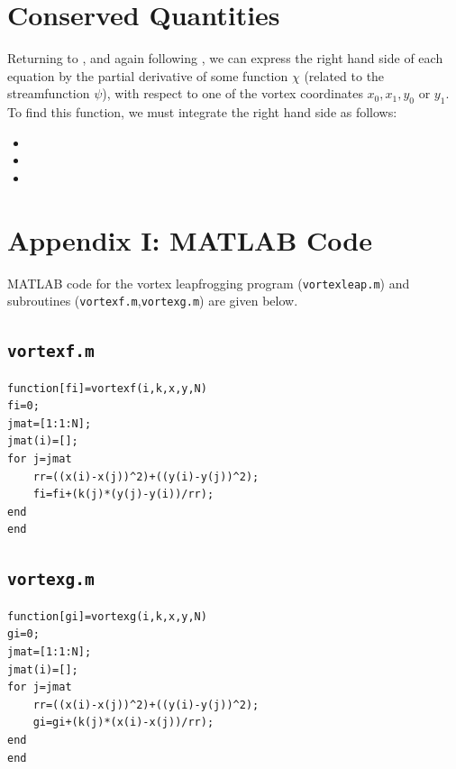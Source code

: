 \documentclass[10pt, a4paper]{article}
\numberwithin{equation}{section}
\begin{document}
\section{Conserved Quantities}
Returning to , and again following \citeauthor{love94}, we can express the right hand side of each equation by the partial derivative of some function $\chi$ (related to the streamfunction $\psi$), with respect to one of the vortex coordinates $x_0,x_1,y_0$ or $y_1$.
To find this function, we must integrate the right hand side as follows:
\begin{itemize}
\item 
\item 
\item 

\end{itemize}
\clearpage
\section*{Appendix I: MATLAB Code}\label{sec:ap1}
MATLAB code for the vortex leapfrogging program (\texttt{vortexleap.m}\normalfont) and subroutines (\texttt{vortexf.m}\normalfont,\texttt{vortexg.m}) are given below.
\subsection*{\texttt{vortexf.m}}
\label{vortexf}
\begin{verbatim}
function[fi]=vortexf(i,k,x,y,N)
fi=0;
jmat=[1:1:N];
jmat(i)=[];
for j=jmat
    rr=((x(i)-x(j))^2)+((y(i)-y(j))^2);
    fi=fi+(k(j)*(y(j)-y(i))/rr);
end
end
\end{verbatim}
\subsection*{\texttt{vortexg.m}}
\label{vortexg}
\begin{verbatim}
function[gi]=vortexg(i,k,x,y,N)
gi=0;
jmat=[1:1:N];
jmat(i)=[];
for j=jmat
    rr=((x(i)-x(j))^2)+((y(i)-y(j))^2);
    gi=gi+(k(j)*(x(i)-x(j))/rr);
end
end
\end{verbatim}
\end{document}
